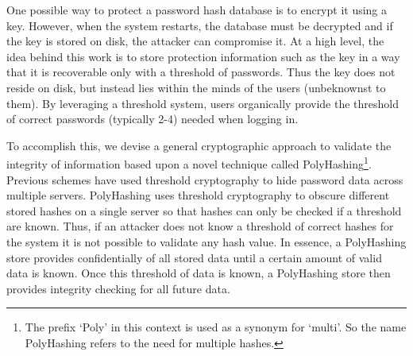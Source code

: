 One possible way to protect a password hash database is to encrypt it using
a key.   However, when the system restarts, the database must be decrypted
and if the key is stored on disk, the attacker can compromise it.   At a high
level, the idea behind this work is to store protection information such as
the key in a way that it is recoverable only with a threshold of passwords.
Thus the key does not reside on disk, but instead lies within the minds of the
users (unbeknownst to them).  By leveraging a threshold system, users 
organically provide the threshold of correct passwords (typically 2-4) 
needed when logging in.   





To accomplish this, we devise a general cryptographic approach to validate 
the integrity of
information based upon a novel technique called PolyHashing\footnote{The
prefix `Poly' in this context is used as a synonym for `multi'.  So the name 
PolyHashing refers to the need for multiple hashes.}.  Previous
schemes have used threshold cryptography to hide password data across multiple 
servers.   PolyHashing uses threshold cryptography to obscure different 
stored hashes on a single server so that hashes can only be checked if a 
threshold are known.   Thus, if an attacker does not know a threshold of 
correct hashes for the system it is not possible to validate 
any hash value.   In essence, a PolyHashing store provides confidentially 
of all stored data until a certain amount of valid data is known.   Once this
threshold of data is known, a PolyHashing store then provides integrity 
checking for all future data.

